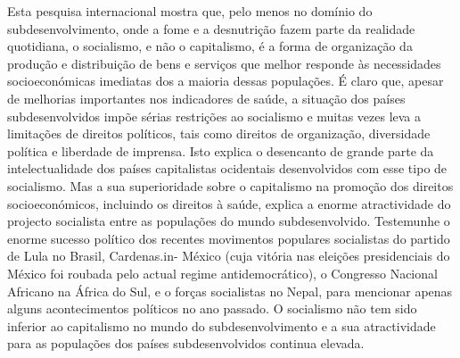 {{{Esta pesquisa internacional mostra que, pelo menos no domínio do subdesenvolvimento, onde a fome e a desnutrição fazem parte da realidade quotidiana, o socialismo, e não o capitalismo, é a forma de organização da produção e distribuição de bens e serviços que melhor responde às necessidades socioeconómicas imediatas dos a maioria dessas populações. É claro que, apesar de melhorias importantes nos indicadores de saúde, a situação dos países subdesenvolvidos impõe sérias restrições ao socialismo e muitas vezes leva a limitações de direitos políticos, tais como direitos de organização, diversidade política e liberdade de imprensa. Isto explica o desencanto de grande parte da intelectualidade dos países capitalistas ocidentais desenvolvidos com esse tipo de socialismo. Mas a sua superioridade sobre o capitalismo na promoção dos direitos socioeconómicos, incluindo os direitos à saúde, explica a enorme atractividade do projecto socialista entre as populações do mundo subdesenvolvido. Testemunhe o enorme sucesso político dos recentes movimentos populares socialistas do partido de Lula no Brasil, Cardenas.in- México (cuja vitória nas eleições presidenciais do México foi roubada pelo actual regime antidemocrático), o Congresso Nacional Africano na África do Sul, e o forças socialistas no Nepal, para mencionar apenas alguns acontecimentos políticos no ano passado. O socialismo não tem sido inferior ao capitalismo no mundo do subdesenvolvimento e a sua atractividade para as populações dos países subdesenvolvidos continua elevada.
 \par 
}}}
